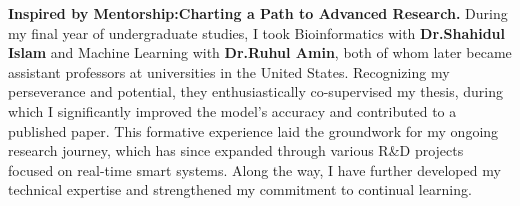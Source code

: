 \textbf{Inspired by Mentorship:Charting a Path to Advanced Research.}
During my final year of undergraduate studies, I took Bioinformatics with \textbf{Dr.Shahidul Islam}
and Machine Learning with \textbf{Dr.Ruhul Amin}, both of whom later became assistant professors
at universities in the United States.
Recognizing my perseverance and potential, they enthusiastically co-supervised my thesis, during which I significantly
improved the model’s accuracy and contributed to a published paper.
This formative experience laid the groundwork for my ongoing research journey, which has since expanded through various R\&D projects
focused on real-time smart systems.
Along the way, I have further developed my technical expertise and strengthened my commitment to continual learning.
